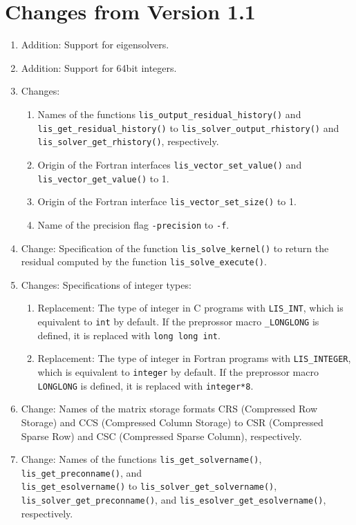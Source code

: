 \documentclass[a4paper]{article}
\begin{document}
\section*{Changes from Version 1.1}
\begin{enumerate}
\item Addition: Support for eigensolvers.
\item Addition: Support for 64bit integers.
\item Changes: 
\begin{enumerate}
\item Names of the functions 
      {\tt lis\_output\_residual\_history()} and \\
      {\tt lis\_get\_residual\_history()} to 
      {\tt lis\_solver\_output\_rhistory()} and \\
      {\tt lis\_solver\_get\_rhistory()}, respectively. 
\item Origin of the Fortran interfaces 
      {\tt lis\_vector\_set\_value()} and \\
      {\tt lis\_vector\_get\_value()} to 1.
\item Origin of the Fortran interface {\tt lis\_vector\_set\_size()} to 1. 
\item Name of the precision flag {\tt -precision} to {\tt -f}.
\end{enumerate}
\item Change: Specification of the function 
      {\tt lis\_solve\_kernel()} to return 
      the residual computed by the function {\tt lis\_solve\_execute()}. 
\item Changes: Specifications of integer types:
\begin{enumerate}
\item Replacement: The type of integer in C programs with {\tt LIS\_INT},
      which is equivalent to {\tt int} by default.
      If the preprossor macro {\tt \_LONGLONG} is defined, 
      it is replaced with {\tt long long int}.
\item Replacement: The type of integer in Fortran programs with 
      {\tt LIS\_INTEGER}, which is equivalent to {\tt integer} by default.
      If the preprossor macro {\tt LONGLONG} is defined, 
      it is replaced with {\tt integer*8}.
\end{enumerate}
\item Change: Names of the matrix storage formats CRS (Compressed Row Storage) 
      and CCS (Compressed Column Storage) to CSR (Compressed Sparse Row) 
      and CSC (Compressed Sparse Column), respectively. 
\item Change: Names of the functions 
      {\tt lis\_get\_solvername()}, {\tt lis\_get\_preconname()}, and \\
      {\tt lis\_get\_esolvername()} to 
      {\tt lis\_solver\_get\_solvername()}, 
      {\tt lis\_solver\_get\_preconname()}, and 
      {\tt lis\_esolver\_get\_esolvername()}, respectively.
\end{enumerate}
\end{document}
